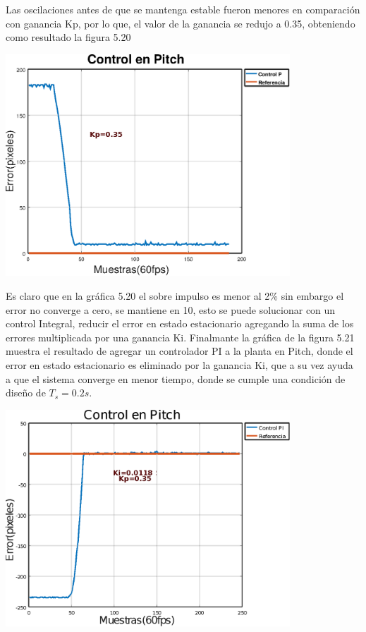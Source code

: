 Las oscilaciones antes de que se mantenga estable fueron menores en comparación con ganancia Kp, por lo que, el valor de la ganancia se 
redujo a 0.35, obteniendo como resultado la figura 5.20 
\begin{center}
	\includegraphics[width=0.8\textwidth]{Contenido/Cuerpo/Capitulo5/Fig27.eps}
	\label{Fig4}
\end{center}
Es claro que en la gráfica 5.20 el sobre impulso es menor al 2\% sin embargo el error no converge a cero, se mantiene en 10, esto se
puede solucionar con un control Integral, reducir el error en estado estacionario agregando la suma de los errores multiplicada por una ganancia
Ki. Finalmante la gráfica de la figura 5.21 muestra el resultado de agregar un controlador PI a la planta en Pitch, donde el error en estado
estacionario es eliminado por la ganancia Ki, que a su vez ayuda a que el sistema converge en menor tiempo, donde se cumple una condición de diseño de $T_s = 0.2s$.
\begin{center}
	\includegraphics[width=0.8\textwidth]{Contenido/Cuerpo/Capitulo5/Fig28.eps}
	\label{Fig4}
\end{center}

